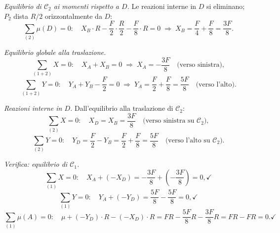 \begin{esempio}
\begin{svolgimento}
		\smallskip
		\noindent\textit{Equilibrio di $\mathcal{C}_2$ ai momenti
			rispetto a $D$.}
		Le reazioni interne in $D$ si eliminano; $P_2$ dista
		$R/2$ orizzontalmente da $D$:
		\begin{equation*}
			\sum_{(2)}\mu(D) = 0:\quad
			X_B \cdot R
			- \frac{F}{2} \cdot \frac{R}{2}
			- \frac{F}{8} \cdot R = 0
			\;\Longrightarrow\;
			X_B = \frac{F}{4} + \frac{F}{8} = \frac{3F}{8}.
		\end{equation*}
		
		\smallskip
		\noindent\textit{Equilibrio globale alla traslazione.}
		\begin{equation*}
			\sum_{(1+2)} X = 0:\quad
			X_A + X_B = 0
			\;\Longrightarrow\;
			X_A = -\frac{3F}{8}
			\quad\text{(verso sinistra)},
		\end{equation*}
		\begin{equation*}
			\sum_{(1+2)} Y = 0:\quad
			Y_A + Y_B - \frac{F}{2} = 0
			\;\Longrightarrow\;
			Y_A = \frac{F}{2} + \frac{F}{8} = \frac{5F}{8}
			\quad\text{(verso l'alto)}.
		\end{equation*}
		
		\smallskip
		\noindent\textit{Reazioni interne in $D$.}
		Dall'equilibrio alla traslazione di $\mathcal{C}_2$:
		\begin{equation*}
			\sum_{(2)} X = 0:\quad
			X_D = X_B = \frac{3F}{8}
			\quad\text{(verso sinistra su $\mathcal{C}_2$)},
		\end{equation*}
		\begin{equation*}
			\sum_{(2)} Y = 0:\quad
			Y_D = \frac{F}{2} - Y_B =
			\frac{F}{2} + \frac{F}{8} = \frac{5F}{8}
			\quad\text{(verso l'alto su $\mathcal{C}_2$)}.
		\end{equation*}
		
		\noindent\textit{Verifica: equilibrio di $\mathcal{C}_1$.}
		\begin{equation*}
			\sum_{(1)} X = 0:\quad
			X_A + (-X_D) = -\frac{3F}{8} + \left(-\frac{3F}{8}\right)
			= 0, \checkmark
		\end{equation*}
		\begin{equation*}
			\sum_{(1)} Y = 0:\quad
			Y_A + (-Y_D) = \frac{5F}{8} - \frac{5F}{8} = 0,
			\checkmark
		\end{equation*}
		\begin{equation*}
			\sum_{(1)}\mu(A) = 0:\quad
			\mu + (-Y_D)\cdot R - (-X_D)\cdot R =
			FR - \frac{5F}{8}R - \frac{3F}{8}R =
			FR - FR = 0. \checkmark
		\end{equation*}
	\end{svolgimento}
\end{esempio}

